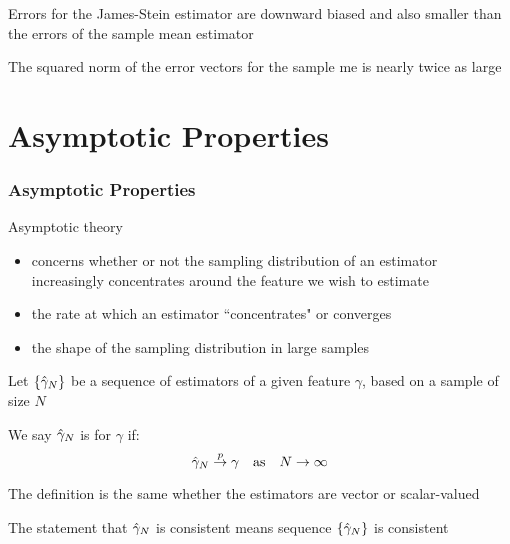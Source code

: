 \begin{frame}

    \vspace{2em}
    Errors for the James-Stein estimator are downward biased 
    and also smaller than the errors of the sample mean estimator
    
    \vspace{.7em}
    The squared
    norm of the error vectors for the sample me is nearly
    twice as large

\end{frame}

\section{Asymptotic Properties}

\begin{frame}\frametitle{Asymptotic Properties}

    \vspace{2em}
    Asymptotic theory
    \begin{itemize}
        \item concerns whether or not the sampling distribution of 
            an estimator increasingly concentrates around the feature we wish to estimate
        \item the rate at which an estimator ``concentrates" or converges 
        \item the shape of the sampling distribution in large samples
    \end{itemize}
    

\end{frame}

\begin{frame}

    \vspace{2em}
    Let $\{\hat \gamma_N\}$ be a sequence of estimators of a given feature
    $\gamma$, based on a sample of size $N$
    
    \vspace{.7em}
    We say $\hat \gamma_N$ is
     for $\gamma$ if:
    \begin{equation}
        \label{eq:consistent}
        \hat \gamma_N \stackrel { p } {\to} \gamma
        \quad \text{as} \quad 
        N \to \infty
    \end{equation}
    
    The definition is the same whether the estimators are vector
    or scalar-valued
    
    The statement that $\hat \gamma_N$ is consistent means
    sequence $\{\hat \gamma_N\}$ is consistent
\end{frame}

